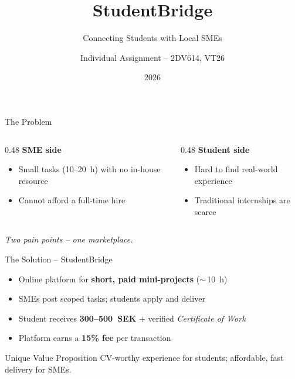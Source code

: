 \documentclass[aspectratio=169]{beamer}
\title{\textbf{StudentBridge}}
\subtitle{Connecting Students with Local SMEs}
\author{Individual Assignment -- 2DV614, VT26}
\date{2026}
\begin{document}
\begin{frame}
  \titlepage
\end{frame}

\begin{frame}{The Problem}
  \begin{columns}[T]
    \begin{column}{0.48\textwidth}
      \textbf{SME side}
      \begin{itemize}
        \item Small tasks (10--20~h) with no in-house resource
        \item Cannot afford a full-time hire
      \end{itemize}
    \end{column}
    \begin{column}{0.48\textwidth}
      \textbf{Student side}
      \begin{itemize}
        \item Hard to find real-world experience
        \item Traditional internships are scarce
      \end{itemize}
    \end{column}
  \end{columns}
  \vspace{1em}
  \centering
  \textit{Two pain points -- one marketplace.}
\end{frame}

\begin{frame}{The Solution -- StudentBridge}
  \begin{itemize}
    \item Online platform for \textbf{short, paid mini-projects} ($\sim$\,10~h)
    \item SMEs post scoped tasks; students apply and deliver
    \item Student receives \textbf{300--500~SEK} + verified \emph{Certificate of Work}
    \item Platform earns a \textbf{15\% fee} per transaction
  \end{itemize}
  \vspace{0.5em}
  \begin{block}{Unique Value Proposition}
    CV-worthy experience for students; affordable, fast delivery for SMEs.
  \end{block}
\end{frame}
\end{document}
